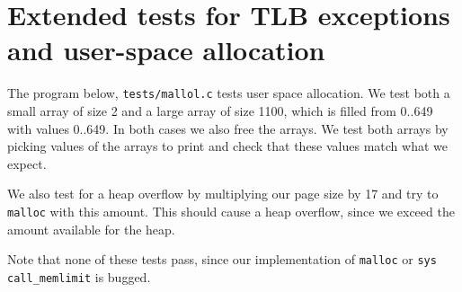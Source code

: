 \documentclass[a4paper,12pt]{article}
\begin{document}


\section{Extended tests for TLB exceptions and user-space allocation}

The program below, \texttt{tests/mallol.c} tests user space allocation. We test both a small array of size 2 and a large array of size 1100, which is filled from 0..649 with values 0..649. In both cases we also free the arrays. We test both arrays by picking values of the arrays to print and check that these values match what we expect.


We also test for a heap overflow by multiplying our page size by 17 and try to \texttt{malloc} with this amount. This should cause a heap overflow, since we exceed the amount available for the heap.
%

Note that none of these tests pass, since our implementation of \texttt{malloc} or \texttt{sys call\_memlimit} is bugged.
\end{document}
